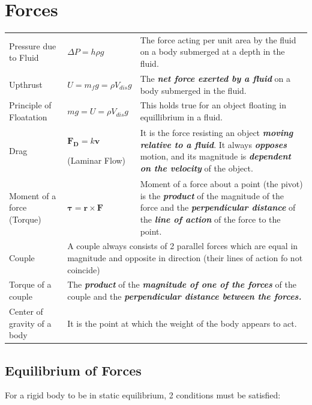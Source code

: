 \documentclass[a4paper,11pt]{article}
\begin{document}
	\section{Forces}
		\begin{center}
			\renewcommand{\arraystretch}{1.2}
			\begin{tabular}{@{} l l p{7cm} @{}}
				\toprule
				Pressure due to Fluid & $\Delta P = h\rho g$ & The force acting per unit area by the fluid on a body submerged at a depth in the fluid. \\
				Upthrust & $U=m_{f}g=\rho V_{dis}g$ & The \textbf{\textit{net force exerted by a fluid}} on a body submerged in the fluid. \\
				Principle of Floatation & $mg=U=\rho V_{dis} g$ & This holds true for an object floating in equillibrium in a fluid.  \\
				Drag & \multicolumn{1}{p{2.5cm}}{$\textbf{F}_{\textbf{D}}=k\textbf{v}$ \par (Laminar Flow)} & It is the force resisting an object \textbf{\textit{moving relative to a fluid}}. It always \textit{\textbf{opposes}} motion, and its magnitude is \textbf{\textit{dependent on the velocity}} of the object.\\
				\midrule
				Moment of a force (Torque) & $\boldsymbol{\tau}=\textbf{r} \times \textbf{F}$ & Moment of a force about a point (the pivot) is the \textit{\textbf{product}} of the magnitude of the force and the \textbf{\textit{perpendicular distance}} of the \textbf{\textit{line of action}} of the force to the point. \\
				Couple & \multicolumn{2}{p{10.3cm}}{A couple always consists of 2 parallel forces which are equal in magnitude and opposite in direction (their lines of action fo not coincide)} \\
				Torque of a couple & \multicolumn{2}{p{10.3cm}}{The \textbf{\textit{product}} of the \textbf{\textit{magnitude of one of the forces}} of the couple and the \textbf{\textit{perpendicular distance between the forces.}}} \\
				Center of gravity of a body & \multicolumn{2}{l}{It is the point at which the weight of the body appears to act.} \\
				\bottomrule
			\end{tabular}
		\end{center}
		\subsection{Equilibrium of Forces}
			For a rigid body to be in static equilibrium, 2 conditions must be satisfied:
			
\end{document}
